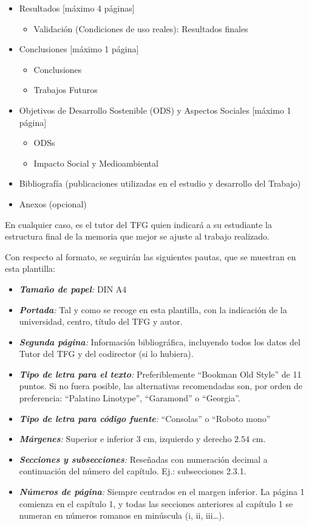 \begin{itemize}
\begin{itemize}
\end{itemize}
\item[•] Resultados [máximo 4 páginas]
\begin{itemize}
    \item Validación (Condiciones de uso reales): Resultados finales
\end{itemize}
\item[•] Conclusiones [máximo 1 página]
\begin{itemize}
    \item Conclusiones
    \item Trabajos Futuros
\end{itemize}
\item[•] Objetivos de Desarrollo Sostenible (ODS) y Aspectos Sociales [máximo 1 página]
\begin{itemize}
    \item ODSs
    \item Impacto Social y Medioambiental 
\end{itemize}
\item[•] Bibliografía (publicaciones utilizadas en el estudio y desarrollo del Trabajo)
\item[•] Anexos (opcional)
\end{itemize}

En cualquier caso, es el tutor del TFG quien indicará a su estudiante la estructura final de la memoria que mejor se ajuste al trabajo realizado.

Con respecto al formato, se seguirán las siguientes pautas, que se muestran en esta plantilla:
\begin{itemize}
\item[•] \textit{\textbf{Tamaño de papel}:} DIN A4
\item[•] \textit{\textbf{Portada}:} Tal y como se recoge en esta plantilla, con la indicación de la universidad, centro, título del TFG y autor.
\item[•] \textit{\textbf{Segunda página}:} Información bibliográfica, incluyendo todos los datos del Tutor del TFG y del codirector (si lo hubiera).
\item[•] \textit{\textbf{Tipo de letra para el texto}:} Preferiblemente “Bookman Old Style” de 11 puntos. Si no fuera posible, las alternativas recomendadas son, por orden de preferencia: “Palatino Linotype”, “Garamond” o “Georgia”.
\item[•] \textit{\textbf{Tipo de letra para código fuente}:} “Consolas” o “Roboto mono”
\item[•] \textit{\textbf{Márgenes}:} Superior e inferior $3$ cm, izquierdo y derecho $2.54$ cm.
\item[•] \textit{\textbf{Secciones y subsecciones}:} Reseñadas con numeración decimal a continuación del número del capítulo. Ej.: subsecciones 2.3.1.
\item[•] \textit{\textbf{Números de página}:} Siempre centrados en el margen inferior. La página 1 comienza en el capítulo 1, y todas las secciones anteriores al capítulo 1 se numeran en números romanos en minúscula (i, ii, iii…).
\end{itemize}

